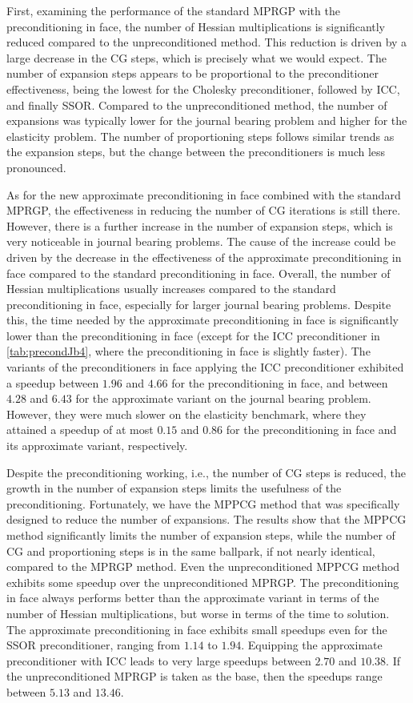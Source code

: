 \documentclass[11pt]{article}
\theoremstyle{plain}
\theoremstyle{definition}
\begin{document}
First, examining the performance of the standard MPRGP with the preconditioning in face, the number of Hessian multiplications is significantly reduced compared to the unpreconditioned method.
This reduction is driven by a large decrease in the CG steps, which is precisely what we would expect.
The number of expansion steps appears to be proportional to the preconditioner effectiveness, being the lowest for the Cholesky preconditioner, followed by ICC, and finally SSOR.
Compared to the unpreconditioned method, the number of expansions was typically lower for the journal bearing problem and higher for the elasticity problem.
The number of proportioning steps follows similar trends as the expansion steps, but the change between the preconditioners is much less pronounced.

As for the new approximate preconditioning in face combined with the standard MPRGP, the effectiveness in reducing the number of CG iterations is still there.
However, there is a further increase in the number of expansion steps, which is very noticeable in journal bearing problems.
The cause of the increase could be driven by the decrease in the effectiveness of the approximate preconditioning in face compared to the standard preconditioning in face.
Overall, the number of Hessian multiplications usually increases compared to the standard preconditioning in face, especially for larger journal bearing problems.
Despite this, the time needed by the approximate preconditioning in face is significantly lower than the preconditioning in face (except for the ICC preconditioner in \cref{tab:precondJb4}, where the preconditioning in face is slightly faster).
The variants of the preconditioners in face applying the ICC preconditioner exhibited a speedup between $1.96$ and $4.66$ for the preconditioning in face, and between $4.28$ and $6.43$ for the approximate variant on the journal bearing problem.
However, they were much slower on the elasticity benchmark, where they attained a speedup of at most $0.15$ and $0.86$ for the preconditioning in face and its approximate variant, respectively.

Despite the preconditioning working, i.e., the number of CG steps is reduced, the growth in the number of expansion steps limits the usefulness of the preconditioning.
Fortunately, we have the MPPCG method that was specifically designed to reduce the number of expansions.
The results show that the MPPCG method significantly limits the number of expansion steps, while the number of CG and proportioning steps is in the same ballpark, if not nearly identical, compared to the MPRGP method.
Even the unpreconditioned MPPCG method exhibits some speedup over the unpreconditioned MPRGP.
The preconditioning in face always performs better than the approximate variant in terms of the number of Hessian multiplications, but worse in terms of the time to solution.
The approximate preconditioning in face exhibits small speedups even for the SSOR preconditioner, ranging from $1.14$ to $1.94$.
Equipping the approximate preconditioner with ICC leads to very large speedups between $2.70$ and $10.38$.
If the unpreconditioned MPRGP is taken as the base, then the speedups range between $5.13$ and $13.46$.
\end{document}
